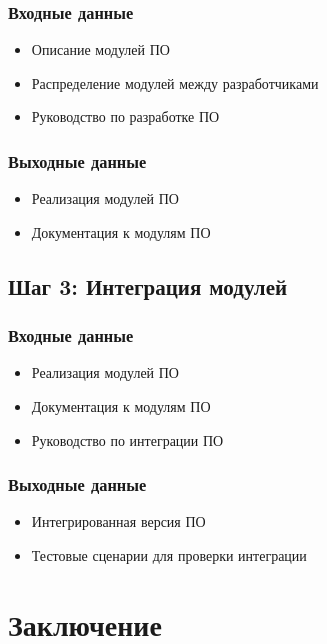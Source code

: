 \documentclass{article}
\begin{document}
\lipsum[4] %

\subsubsection{Входные данные}

\begin{itemize}
    \item Описание модулей ПО
    \item Распределение модулей между разработчиками
    \item Руководство по разработке ПО
\end{itemize}

\subsubsection{Выходные данные}

\begin{itemize}
    \item Реализация модулей ПО
    \item Документация к модулям ПО
\end{itemize}

\subsection{Шаг 3: Интеграция модулей}

\lipsum[5] %

\subsubsection{Входные данные}

\begin{itemize}
    \item Реализация модулей ПО
    \item Документация к модулям ПО
    \item Руководство по интеграции ПО
\end{itemize}

\subsubsection{Выходные данные}

\begin{itemize}
    \item Интегрированная версия ПО
    \item Тестовые сценарии для проверки интеграции
\end{itemize}

\section{Заключение}

\lipsum[6] %
\end{document}
